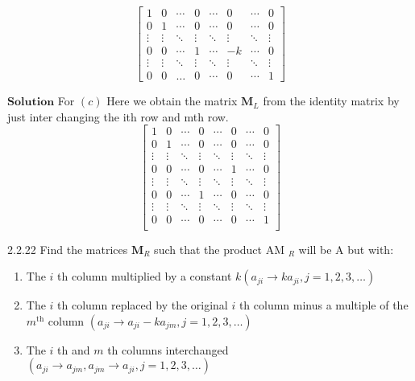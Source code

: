 \documentclass{article}
\begin{document}
\begin{flushleft}
$$\begin{bmatrix}
1 & 0 & \cdots & 0 & \cdots & 0&\cdots&0 \\ 
0 & 1 & \cdots  & 0 & \cdots &0&\cdots& 0\\ 
\vdots & \vdots & \ddots & \vdots & \ddots &\vdots&\ddots &\vdots\\ 
0 & 0 & \cdots & 1 &\cdots & -k &\cdots &0 \\ 
\vdots & \vdots & \ddots & \vdots  &\ddots &\vdots &\ddots &\vdots\\
0&0&\dots&0&\cdots&0&\cdots&1
\end{bmatrix}$$

$\boxed{\textbf{Solution}}$  For $(c)$ Here we obtain the matrix $\mathbf{M}_{L}$ from the identity matrix by just inter changing the ith row and mth row.
$$\begin{bmatrix}
1& 0  &\cdots  & 0 & \cdots & 0 & \cdots &0 \\ 
0&1  &\cdots  &0  & \cdots & 0 & \cdots & 0\\ 
\vdots& \vdots & \ddots & \vdots & \ddots & \vdots & \ddots& \vdots\\ 
0 & 0 & \cdots &0  &\cdots  & 1 & \cdots & 0\\ 
 \vdots& \vdots & \ddots & \vdots & \ddots & \vdots & \ddots& \vdots\\ 
0 & 0 & \cdots &1  &\cdots  & 0 & \cdots & 0\\ 
 \vdots& \vdots & \ddots & \vdots & \ddots & \vdots & \ddots& \vdots\\  
0 & 0 & \cdots &0  &\cdots  & 0 & \cdots & 1\\ 
\end{bmatrix}$$





\begin{mybox}{2.2.22}
Find the matrices $\mathbf{M}_{R}$ such that the product AM $_{R}$ will be A but with:

\begin{enumerate}[$(a)$]
\item The $i$ th column multiplied by a constant $k\left(a_{j i} \rightarrow k a_{j i}, j=1,2,3, \ldots\right)$
\item The $i$ th column replaced by the original $i$ th column minus a multiple of the $m^{\text{th}}$ column $\left(a_{j i} \rightarrow a_{j i}-k a_{j m}, j=1,2,3, \ldots\right)$
\item The $i$ th and $m$ th columns interchanged $\left(a_{j i} \rightarrow a_{j m}, a_{j m} \rightarrow a_{j i}, j=1,2,3, \ldots\right)$
\end{enumerate}
\end{mybox}



\end{flushleft}
\end{document}
